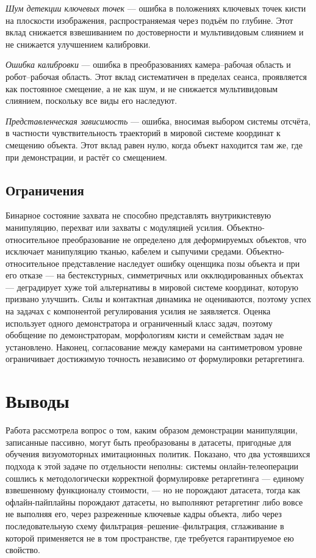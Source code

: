 \documentclass[12pt, a4paper, oneside]{report}
\begin{document}
\emph{Шум детекции ключевых точек} --- ошибка в положениях ключевых точек кисти
на плоскости изображения, распространяемая через подъём по глубине. Этот вклад
снижается взвешиванием по достоверности и мультивидовым слиянием и не снижается
улучшением калибровки.

\emph{Ошибка калибровки} --- ошибка в преобразованиях камера--рабочая область и
робот--рабочая область. Этот вклад систематичен в пределах сеанса, проявляется
как постоянное смещение, а не как шум, и не снижается мультивидовым слиянием,
поскольку все виды его наследуют.

\emph{Представленческая зависимость} --- ошибка, вносимая выбором системы
отсчёта, в частности чувствительность траекторий в мировой системе координат к
смещению объекта. Этот вклад равен нулю, когда объект находится там же, где при
демонстрации, и растёт со смещением.

\section{Ограничения}

Бинарное состояние захвата не способно представлять внутрикистевую манипуляцию,
перехват или захваты с модуляцией усилия. Объектно-относительное преобразование
не определено для деформируемых объектов, что исключает манипуляцию тканью,
кабелем и сыпучими средами. Объектно-относительное представление наследует
ошибку оценщика позы объекта и при его отказе --- на бестекстурных, симметричных
или окклюдированных объектах --- деградирует хуже той альтернативы в мировой
системе координат, которую призвано улучшить. Силы и контактная динамика не
оцениваются, поэтому успех на задачах с компонентой регулирования усилия не
заявляется. Оценка использует одного демонстратора и ограниченный класс задач,
поэтому обобщение по демонстраторам, морфологиям кисти и семействам задач не
установлено. Наконец, согласование между камерами на сантиметровом уровне
ограничивает достижимую точность независимо от формулировки ретаргетинга.

\chapter{Выводы}

Работа рассмотрела вопрос о том, каким образом демонстрации манипуляции,
записанные пассивно, могут быть преобразованы в датасеты, пригодные для обучения
визуомоторных имитационных политик. Показано, что два устоявшихся подхода к этой
задаче по отдельности неполны: системы онлайн-телеоперации сошлись к
методологически корректной формулировке ретаргетинга --- единому взвешенному
функционалу стоимости, --- но не порождают датасета, тогда как офлайн-пайплайны
порождают датасеты, но выполняют ретаргетинг либо вовсе не выполняя его, через
разреженные ключевые кадры объекта, либо через последовательную схему
фильтрация--решение--фильтрация, сглаживание в которой применяется не в том
пространстве, где требуется гарантируемое ею свойство.
\end{document}
